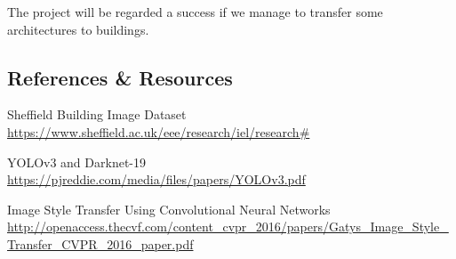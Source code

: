 \documentclass[a4paper, 12pt]{article}
\begin{document}
		The project will be regarded a success if we manage to transfer some architectures to buildings.
		
		\subsection*{References \& Resources}
			Sheffield Building Image Dataset \\ \url{https://www.sheffield.ac.uk/eee/research/iel/research#} 
			\vspace{2mm}
			
			\noindent
			YOLOv3 and Darknet-19\\
			\url{https://pjreddie.com/media/files/papers/YOLOv3.pdf}
			\vspace{2mm}
			
			\noindent
			Image Style Transfer Using Convolutional Neural Networks\\
			\url{http://openaccess.thecvf.com/content_cvpr_2016/papers/Gatys_Image_Style_Transfer_CVPR_2016_paper.pdf}
\end{document}
